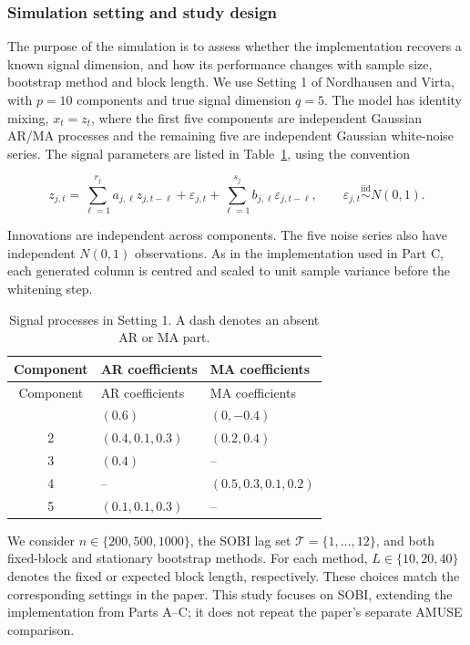\documentclass[
  11pt,
  a4paper,
]{article}
\begin{document}
\hypertarget{simulation-setting-and-study-design}{%
\subsubsection{Simulation setting and study
design}\label{simulation-setting-and-study-design}}

The purpose of the simulation is to assess whether the implementation
recovers a known signal dimension, and how its performance changes with
sample size, bootstrap method and block length. We use Setting 1 of
Nordhausen and Virta, with \(p=10\) components and true signal dimension
\(q=5\). The model has identity mixing, \(x_t=z_t\), where the first
five components are independent Gaussian AR/MA processes and the
remaining five are independent Gaussian white-noise series. The signal
parameters are listed in Table~\ref{tbl-de-processes}, using the
convention

\[
z_{j,t}=\sum_{\ell=1}^{r_j}a_{j,\ell}z_{j,t-\ell}
      +\varepsilon_{j,t}
      +\sum_{\ell=1}^{s_j}b_{j,\ell}\varepsilon_{j,t-\ell},
\qquad \varepsilon_{j,t}\overset{\mathrm{iid}}{\sim}N(0,1).
\]

Innovations are independent across components. The five noise series
also have independent \(N(0,1)\) observations. As in the implementation
used in Part C, each generated column is centred and scaled to unit
sample variance before the whitening step.

\hypertarget{tbl-de-processes}{}
\begin{longtable}[]{@{}cll@{}}
\caption{\label{tbl-de-processes}Signal processes in Setting 1. A dash
denotes an absent AR or MA part.}\tabularnewline
\toprule\noalign{}
Component & AR coefficients & MA coefficients \\
\midrule\noalign{}
\endfirsthead
\toprule\noalign{}
Component & AR coefficients & MA coefficients \\
\midrule\noalign{}
\endhead
\bottomrule\noalign{}
\endlastfoot
1 & \((0.6)\) & \((0,-0.4)\) \\
2 & \((0.4,0.1,0.3)\) & \((0.2,0.4)\) \\
3 & \((0.4)\) & -- \\
4 & -- & \((0.5,0.3,0.1,0.2)\) \\
5 & \((0.1,0.1,0.3)\) & -- \\
\end{longtable}

We consider \(n\in\{200,500,1000\}\), the SOBI lag set
\(\mathcal T=\{1,\ldots,12\}\), and both fixed-block and stationary
bootstrap methods. For each method, \(L\in\{10,20,40\}\) denotes the
fixed or expected block length, respectively. These choices match the
corresponding settings in the paper. This study focuses on SOBI,
extending the implementation from Parts A--C; it does not repeat the
paper's separate AMUSE comparison.
\end{document}
